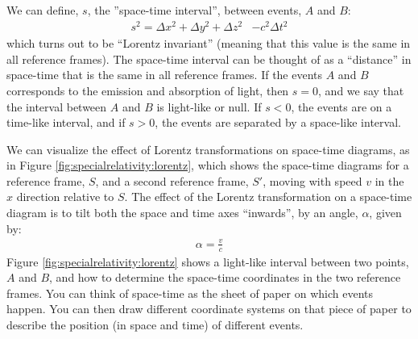 We can define, $s$, the ''space-time interval'', between events, $A$ and $B$:
\begin{align*}
s^2 = \Delta x^2 + \Delta y^2 +\Delta z^2&-c^2\Delta t^2
\end{align*}
which turns out to be ``Lorentz invariant'' (meaning that this value is the same in all reference frames). The space-time interval can be thought of as a ``distance'' in space-time that is the same in all reference frames. If the events $A$ and $B$ corresponds to the emission and absorption of light, then $s=0$, and we say that the interval between $A$ and $B$ is light-like or null. If $s<0$, the events are on a time-like interval, and if $s>0$, the events are separated by a space-like interval.

We can visualize the effect of Lorentz transformations on space-time diagrams, as in Figure \ref{fig:specialrelativity:lorentz}, which shows the space-time diagrams for a reference frame, $S$, and a second reference frame, $S'$, moving with speed $v$ in the $x$ direction relative to $S$.
The effect of the Lorentz transformation on a space-time diagram is to tilt both the space and time axes ``inwards'', by an angle, $\alpha$, given by:
\begin{align*}
\alpha = \frac{v}{c}
\end{align*}
Figure \ref{fig:specialrelativity:lorentz} shows a light-like interval between two points, $A$ and $B$, and how to determine the space-time coordinates in the two reference frames. You can think of space-time as the sheet of paper on which events happen. You can then draw different coordinate systems on that piece of paper to describe the position (in space and time) of different events.

